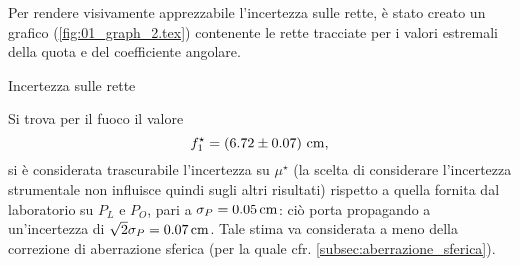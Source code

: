 Per rendere visivamente apprezzabile l'incertezza sulle rette, \`e stato creato un grafico (\autoref{fig:01_graph_2.tex}) contenente le rette tracciate per i valori estremali della quota e del coefficiente angolare.
\begin{grafico} \centering  \caption{Incertezza sulle rette} \label{fig:01_graph_2.tex} \end{grafico}

Si trova per il fuoco il valore 
\[ f^{\star}_1=\left(6.72 \pm 0.07\right) \,\mathrm{cm} , \] 
si \`e considerata trascurabile l'incertezza su $\mu^{\star}$ (la scelta di considerare l'incertezza strumentale non influisce quindi sugli altri risultati) rispetto a quella fornita dal laboratorio su $P_L$ e $P_O$, pari a $\sigma _P = 0.05 \,\mathrm{cm}$: ci\`o porta propagando a un'incertezza di $\sqrt{2}   \sigma_P = 0.07 \,\mathrm{cm}$. Tale stima va considerata a meno della correzione di aberrazione sferica (per la quale cfr. \autoref{subsec:aberrazione_sferica}).

